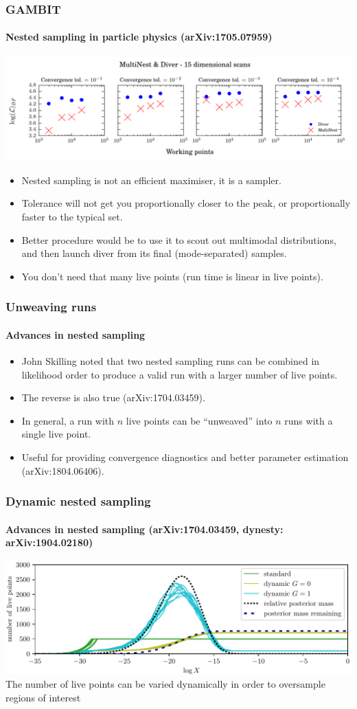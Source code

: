 \documentclass[%
]{beamer}
\begin{document}
\begin{frame}
    \frametitle{GAMBIT}
    \framesubtitle{Nested sampling in particle physics (arXiv:1705.07959)}
    \includegraphics[width=\textwidth]{./figures/mn_pp_2.pdf}
    \begin{itemize}
        \item Nested sampling is not an efficient maximiser, it is a sampler.
        \item Tolerance will not get you proportionally closer to the peak, or proportionally faster to the typical set.
        \item Better procedure would be to use it to scout out multimodal distributions, and then launch diver from its final (mode-separated) samples.
        \item You don't need that many live points (run time is linear in live points).
    \end{itemize}
\end{frame}

\begin{frame}
    \frametitle{Unweaving runs}
    \framesubtitle{Advances in nested sampling}
    \begin{itemize}
        \item John Skilling noted that two nested sampling runs can be combined in likelihood order to produce a valid run with a larger number of live points.
        \item The reverse is also true (arXiv:1704.03459).
        \item In general, a run with $n$ live points can be ``unweaved'' into $n$ runs with a single live point.
        \item Useful for providing convergence diagnostics and better parameter estimation (arXiv:1804.06406).
    \end{itemize}
\end{frame}


\begin{frame}
  \frametitle{Dynamic nested sampling}
  \framesubtitle{Advances in nested sampling (arXiv:1704.03459,  dynesty: arXiv:1904.02180)}
  \includegraphics[width=\textwidth]{figures/dynesty.pdf}
  The number of live points can be varied dynamically in order to oversample regions of interest
\end{frame}
\end{document}
